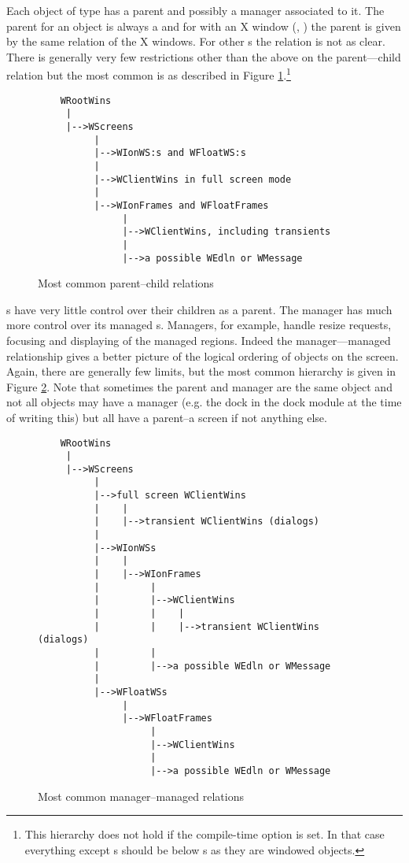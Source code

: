 
Each object of type  has a parent and possibly a manager
associated to it. The parent for an object is always a 
 and for  with an X window (,
) the parent  is given by the same relation of
the X windows. For other s the relation is not as clear.
There is generally very few restrictions other than the above on the
parent---child relation but the most common is as described in
Figure \ref{fig:parentship}.\footnote{This hierarchy does not hold
  if the compile-time option  is set. In that
  case everything except s  should be below s
  as they are windowed objects.}

\begin{figure}
\begin{verbatim}
    WRootWins
     |
     |-->WScreens
          |
          |-->WIonWS:s and WFloatWS:s
          |
          |-->WClientWins in full screen mode
          |
          |-->WIonFrames and WFloatFrames
               |
               |-->WClientWins, including transients
               |
               |-->a possible WEdln or WMessage
\end{verbatim}
\caption{Most common parent--child relations}
\label{fig:parentship}
\end{figure}

s have very little control over their children as a parent.
The manager  has much more control over its
managed s. Managers, for example, handle resize requests,
focusing and displaying of the managed regions. Indeed the manager---managed
relationship gives a better picture of the logical ordering of objects on
the screen. Again, there are generally few limits, but the most common
hierarchy is given in Figure \ref{fig:managership}. Note that sometimes
the parent and manager are the same object and not all objects may have
a manager (e.g. the dock in the dock module at the time of writing this)
but all have a parent--a screen if not anything else.

\begin{figure}
\begin{verbatim}
    WRootWins
     |
     |-->WScreens
          |
          |-->full screen WClientWins
          |    |
          |    |-->transient WClientWins (dialogs)
          |
          |-->WIonWSs
          |    |
          |    |-->WIonFrames
          |         |
          |         |-->WClientWins
          |         |    |
          |         |    |-->transient WClientWins (dialogs)
          |         |
          |         |-->a possible WEdln or WMessage
          |
          |-->WFloatWSs
               |
               |-->WFloatFrames
                    |
                    |-->WClientWins
                    |
                    |-->a possible WEdln or WMessage
\end{verbatim}
\caption{Most common manager--managed relations}
\label{fig:managership}
\end{figure}

